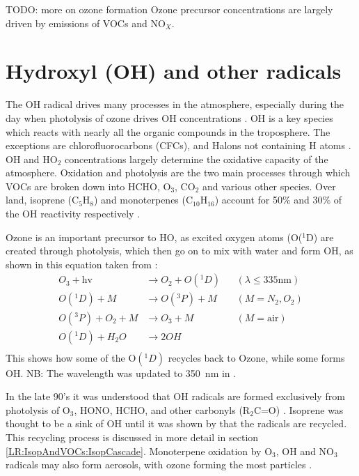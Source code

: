     TODO: more on ozone formation
    Ozone precursor concentrations are largely driven by emissions of VOCs and NO$_X$.
    
\section{Hydroxyl (OH) and other radicals}
  \label{LR:Radicals}
  The OH radical drives many processes in the atmosphere, especially during the day when photolysis of ozone drives OH concentrations \citep{Atkinson2000}.    
  OH is a key species which reacts with nearly all the organic compounds in the troposphere.
  The exceptions are chlorofluorocarbons (CFCs), and Halons not containing H atoms \citep{Atkinson2000}.
  OH and HO$_2$ concentrations largely determine the oxidative capacity of the atmosphere.
  Oxidation and photolysis are the two main processes through which VOCs are broken down into HCHO, O$_3$, CO$_2$ and various other species.
  Over land, isoprene (C$_5$H$_8$) and monoterpenes (C$_10$H$_16$) account for 50\% and 30\% of the OH reactivity respectively \citep{Fuentes2000}.
  
  Ozone is an important precursor to HO, as excited oxygen atoms (O(${}^1$D) are created through photolysis, which then go on to mix with water and form OH, as shown in this equation taken from \citet{Atkinson2000}:
  \begin{align*}
	\label{LR:O3andAQ:Radicals:O3toOH}
    O_3 + \text{hv}         & \to  O_2 + O({}^1D)   && (\lambda \le 335 \text{nm}) \\%
    O({}^1D) + M            & \to  O({}^3P) + M     && (M=N_2, O_2)               \\%
    O({}^3P) + O_2 + M      & \to  O_3 + M          && (M=\text{air})             \\%
    O({}^1D) + H_2O         & \to  2OH              &&                            \\%
  \end{align*}
  This shows how some of the O$({}^1D)$ recycles back to Ozone, while some forms OH.
  NB: The wavelength was updated to 350~nm in \citet{AtkinsonArey2003}.
  
  In the late 90's it was understood that OH radicals are formed exclusively from photolysis of O$_3$, HONO, HCHO, and other carbonyls (R$_2$C=O) \citet{Atkinson2000}.
  Isoprene was thought to be a sink of OH until it was shown by \cite{Paulot2009b} that the radicals are recycled.
  This recycling process is discussed in more detail in section \ref{LR:IsopAndVOCs:IsopCascade}.
  Monoterpene oxidation by O$_3$, OH and NO$_3$ radicals may also form aerosols, with ozone forming the most particles \citep{Kanakidou2005}.
  
